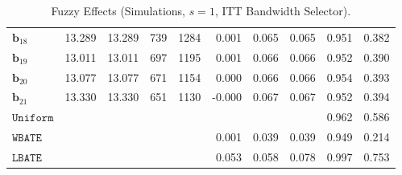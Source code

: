 \documentclass[10pt]{article}
\newcommand{\bb}{\mathbf{b}}
\begin{document}
\begin{table}[p]
\begin{tabular}{lccccrrrrr}
$\bb_{18}$ & 13.289 & 13.289 & 739 & 1284 & 0.001 & 0.065 & 0.065 & 0.951 & 0.382 \\
$\bb_{19}$ & 13.011 & 13.011 & 697 & 1195 & 0.001 & 0.066 & 0.066 & 0.952 & 0.390 \\
$\bb_{20}$ & 13.077 & 13.077 & 671 & 1154 & 0.000 & 0.066 & 0.066 & 0.954 & 0.393 \\
$\bb_{21}$ & 13.330 & 13.330 & 651 & 1130 & -0.000 & 0.067 & 0.067 & 0.952 & 0.394 \\
\midrule
$\mathtt{Uniform}$ &  &  &  &  &  &  &  & 0.962 & 0.586 \\
\midrule
$\mathtt{WBATE}$ &  &  &  &  & 0.001 & 0.039 & 0.039 & 0.949 & 0.214 \\
\midrule
$\mathtt{LBATE}$ &  &  &  &  & 0.053 & 0.058 & 0.078 & 0.997 & 0.753 \\
\bottomrule\bottomrule
\end{tabular}

    \caption{Fuzzy Effects (Simulations, $s=1$, ITT Bandwidth Selector).}
    \label{tab:sa-simuls-fuzzy-s1}
\end{table}
\end{document}
